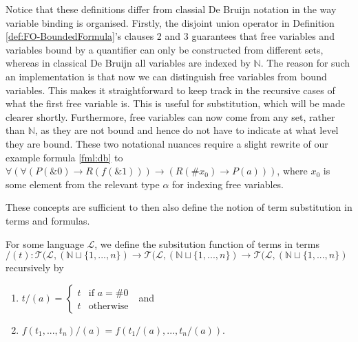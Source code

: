 Notice that these definitions differ from classial De Bruijn \cite{bruijn:1972} notation in the way variable binding is organised. Firstly, the disjoint union operator in Definition \ref{def:FO-BoundedFormula}'s clauses 2 and 3 guarantees that free variables and variables bound by a quantifier can only be constructed from different sets, whereas in classical De Bruijn all variables are indexed by $\mathbb{N}$. The reason for such an implementation is that now we can distinguish free variables from bound variables. This makes it straightforward to keep track in the recursive cases of what the first free variable is. This is useful for substitution, which will be made clearer shortly. Furthermore, free variables can now come from any set, rather than $\mathbb{N}$, as they are not bound and hence do not have to indicate at what level they are bound. These two notational nuances require a slight rewrite of our example formula \ref{fml:db} to $\forall (\forall(P(\&0) \rightarrow R(f(\&1))) \to (R(\#x_0) \to P(a)))$, where $x_0$ is some element from the relevant type $\alpha$ for indexing free variables.

These concepts are sufficient to then also define the notion of term substitution in terms and formulas. 
\begin{definition}\label{def:Term-Substitution}
\leanok
{}
For some language $\mathcal{L}$, we define the subsitution function of terms in terms $/(t) : \mathcal{T}(\mathcal{L},(\mathbb{N} \sqcup \{1,...,n\}) \to \mathcal{T}(\mathcal{L},(\mathbb{N} \sqcup \{1,...,n\}) \to \mathcal{T}(\mathcal{L},(\mathbb{N} \sqcup \{1,...,n\})$ recursively by
\begin{enumerate}
\item $t/(a) = \begin{cases}
    t & \text{if } a = \#0 \\
    t & \text{otherwise }
\end{cases}$ and
\item $f(t_1,...,t_n)/(a) = f(t_1/(a),...,t_n/(a))$.
\end{enumerate}
\end{definition}

